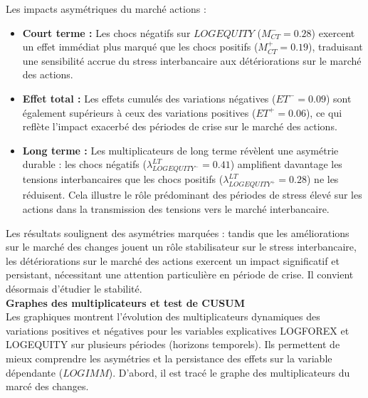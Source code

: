 Les impacts asymétriques du marché actions :
\begin{itemize}
    \item \textbf{Court terme :} Les chocs négatifs sur \(LOGEQUITY\) (\(M_{CT}^- = 0.28\)) exercent un effet immédiat plus marqué que les chocs positifs (\(M_{CT}^+ = 0.19\)), traduisant une sensibilité accrue du stress interbancaire aux détériorations sur le marché des actions.
    \item \textbf{Effet total :} Les effets cumulés des variations négatives (\(ET^- = 0.09\)) sont également supérieurs à ceux des variations positives (\(ET^+ = 0.06\)), ce qui reflète l’impact exacerbé des périodes de crise sur le marché des actions.
    \item \textbf{Long terme :} Les multiplicateurs de long terme révèlent une asymétrie durable : les chocs négatifs (\(\lambda^{LT}_{LOGEQUITY^-} = 0.41\)) amplifient davantage les tensions interbancaires que les chocs positifs (\(\lambda^{LT}_{LOGEQUITY^+} = 0.28\)) ne les réduisent. Cela illustre le rôle prédominant des périodes de stress élevé sur les actions dans la transmission des tensions vers le marché interbancaire.
\end{itemize}

Les résultats soulignent des asymétries marquées : tandis que les améliorations sur le marché des changes jouent un rôle stabilisateur sur le stress interbancaire, les détériorations sur le marché des actions exercent un impact significatif et persistant, nécessitant une attention particulière en période de crise. Il convient désormais d'étudier le stabilité.\\

\textbf{Graphes des multiplicateurs et test de CUSUM} \\

Les graphiques montrent l’évolution des multiplicateurs dynamiques des variations positives et négatives pour les variables explicatives LOGFOREX et LOGEQUITY sur plusieurs périodes (horizons temporels). Ils permettent de mieux comprendre les asymétries et la persistance des effets sur la variable dépendante (\(LOGIMM\)). D'abord, il est tracé le graphe des multiplicateurs du marcé des changes.

